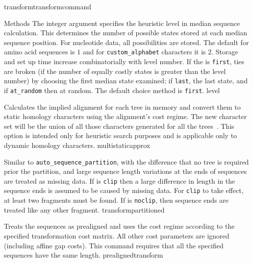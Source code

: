 \begin{command}{transform}{transformcommand}
\begin{arguments}
\begin{argumentgroup}{Methods}
          {The integer argument specifies the heuristic level in median sequence calculation.  
            This determines the number of possible states stored at each median sequence position.  
            For nucleotide data, all possibilities are stored.  The default for amino acid sequences is $1$
            and for \texttt{custom\_alphabet} characters it is $2$.  Storage and set up time increase combinatorially with
            level number. 
            If the \poylident is \texttt{first}, ties are broken (if the number of equally costly states is greater than the level number)
            by choosing the first median state examined; if \texttt{last}, the last state, and if \texttt{at\_random} then at random.
            The default choice method is \texttt{first}.}
          {level}

            {Calculates the implied alignment for each tree in memory
            and convert them to static homology characters using the alignment's
            cost regime. The new character set will be the union of all those
            characters generated for all the trees~\cite{wheeler1995a}. This option is intended only
            for heuristic search purposes and is applicable only to dynamic homology characters.}
            {multistaticapprox}

            {Similar to \texttt{auto\_sequence\_partition}, with the difference that no tree is
            required prior the partition, and large sequence length variations
            at the ends of sequences are treated as missing data. If \poylident is \texttt{clip} then
            a large difference in length in the sequence ends is assumed to be caused by
            missing data. For \texttt{clip} to take effect, at least two fragments must
            be found. If \poylident is \texttt{noclip}, then sequence ends are treated like
            any other fragment.}
            {transformpartitioned}
            
                {Treats the sequences as prealigned and uses the
                cost regime according to the specified transformation cost
                matrix. All other cost parameters are ignored (including affine
                gap costs). This command requires that all the specified sequences have the same length.}
                {prealignedtransform}
                

\end{argumentgroup}
\end{arguments}
\end{command}
